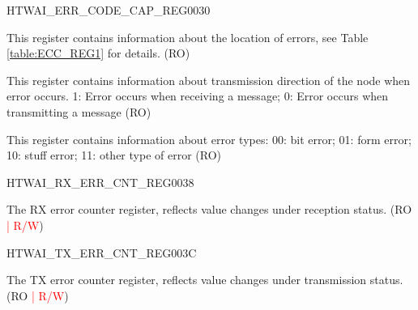 \begin{register}{H}{TWAI\_ERR\_CODE\_CAP\_REG}{\hexprefix{}0030}\label{regdesc:TWAIERRCODECAPREG}
%
%
%
%
\regnewline%
\begin{regdesc}\begin{reglist}
\label{fielddesc:TWAIECCSEGMENT}\item [TWAI\_ECC\_SEGMENT] This register contains information about the location of errors, see Table \ref{table:ECC_REG1} for details. (RO)
\label{fielddesc:TWAIECCDIRECTION}\item [TWAI\_ECC\_DIRECTION] This register contains information about transmission direction of the node when error occurs. 1: Error occurs when receiving a message; 0: Error occurs when transmitting a message (RO)
\label{fielddesc:TWAIECCTYPE}\item [TWAI\_ECC\_TYPE] This register contains information about error types:
00: bit error; 01: form error; 10: stuff error; 11: other type of error (RO)
\end{reglist}\end{regdesc}
\end{register}


\begin{register}{H}{TWAI\_RX\_ERR\_CNT\_REG}{\hexprefix{}0038}\label{regdesc:TWAIRXERRCNTREG}
%
%
\regnewline%
\begin{regdesc}\begin{reglist}
\label{fielddesc:TWAIRXERRCNT}\item [TWAI\_RX\_ERR\_CNT] The RX error counter register, reflects value changes under reception status. (RO \textcolor{red}{| R/W})
\end{reglist}\end{regdesc}
\end{register}


\begin{register}{H}{TWAI\_TX\_ERR\_CNT\_REG}{\hexprefix{}003C}\label{regdesc:TWAITXERRCNTREG}
%
%
\regnewline%
\begin{regdesc}\begin{reglist}
\label{fielddesc:TWAITXERRCNT}\item [TWAI\_TX\_ERR\_CNT] The TX error counter register, reflects value changes under transmission status. (RO \textcolor{red}{| R/W})
\end{reglist}\end{regdesc}
\end{register}


